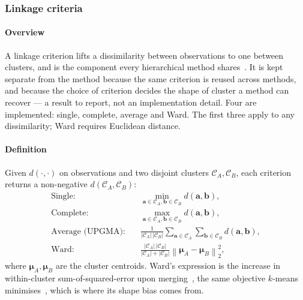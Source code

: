 \subsubsection{Linkage criteria}
\label{sec:tech:linkage}

\paragraph{Overview}
\label{sec:tech:linkage:overview}
A linkage criterion lifts a dissimilarity between observations to one
between clusters, and is the component every hierarchical method
shares~\cite{ref_11}. It is kept separate from the method because the
same criterion is reused across methods, and because the choice of
criterion decides the shape of cluster a method can recover --- a result
to report, not an implementation detail. Four are implemented: single,
complete, average and Ward. The first three apply to any dissimilarity;
Ward requires Euclidean distance.

\paragraph{Definition}
\label{sec:tech:linkage:definition}
Given $d(\cdot, \cdot)$ on observations and two disjoint clusters
$\mathcal C_A, \mathcal C_B$, each criterion returns a non-negative
$d(\mathcal C_A, \mathcal C_B)$:
\begin{align}
    \text{Single:}   \quad & \min_{\mathbf a \in \mathcal C_A, \mathbf b \in \mathcal C_B}
          d(\mathbf a, \mathbf b), \\
    \text{Complete:} \quad & \max_{\mathbf a \in \mathcal C_A, \mathbf b \in \mathcal C_B}
          d(\mathbf a, \mathbf b), \\
    \text{Average (UPGMA):} \quad &
        \tfrac{1}{|\mathcal C_A| \, |\mathcal C_B|}
          \textstyle \sum_{\mathbf a \in \mathcal C_A}
                     \sum_{\mathbf b \in \mathcal C_B}
          d(\mathbf a, \mathbf b), \\
    \text{Ward:} \quad &
        \tfrac{|\mathcal C_A| \, |\mathcal C_B|}
              {|\mathcal C_A| + |\mathcal C_B|}
          \left\| \boldsymbol \mu_A - \boldsymbol \mu_B \right\|_2^2,
\end{align}
where $\boldsymbol \mu_A, \boldsymbol \mu_B$ are the cluster centroids.
Ward's expression is the increase in within-cluster sum-of-squared-error
upon merging~\cite{ref_28}, the same objective $k$-means
minimises~\cite{ref_25}, which is where its shape bias comes from.

